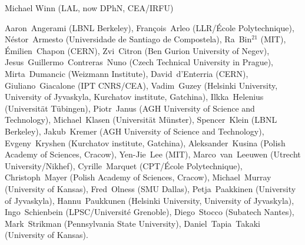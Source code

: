 { \small
{} Michael Winn (LAL, now DPhN, CEA/IRFU) %

 Aaron~Angerami (LBNL Berkeley), %
 Fran\c{c}ois~Arleo (LLR/{\'E}cole Polytechnique), %
 N{\'e}stor~Armesto (Universidade de Santiago de Compostela), %
 Ra~Bin$^{21}$ (MIT), %
 {\'E}milien~Chapon (CERN), %
 Zvi~Citron (Ben Gurion University of Negev), %
 Jesus~Guillermo~Contreras~Nuno (Czech Technical University in Prague),  %
 Mirta~Dumancic (Weizmann Institute),
 David~d'Enterria (CERN), %
 Giuliano~Giacalone (IPT CNRS/CEA), %
 Vadim~Guzey (Helsinki University, University of Jyvaskyla, Kurchatov institute, Gatchina),  %
 Ilkka~Helenius (Universit\"{a}t T\"{u}bingen), %
Piotr~Janus (AGH University of Science and Technology),
Michael~Klasen (Universit\"{a}t M\"{u}nster), %
Spencer~Klein (LBNL Berkeley), %
Jakub~Kremer (AGH University of Science and Technology),
 Evgeny~Kryshen (Kurchatov institute, Gatchina), %
 Aleksander~Kusina (Polish Academy of Sciences, Cracow), %
 Yen-Jie~Lee (MIT), %
 Marco~van~Leeuwen (Utrecht University/Nikhef), %
 Cyrille~Marquet (CPT/{\'E}cole Polytechnique), %
 Christoph~Mayer  (Polish Academy of Sciences, Cracow), %
 Michael~Murray (University of Kansas),%
 Fred~Olness (SMU Dallas), %
 Petja~Paakkinen (University of Jyvaskyla),%
 Hannu~Paukkunen (Helsinki University, University of Jyvaskyla), %
 Ingo~Schienbein (LPSC/Universit{\'e} Grenoble), %
 Diego~Stocco (Subatech Nantes), %
 Mark~Strikman (Pennsylvania State University), %
 Daniel~Tapia~Takaki (University of Kansas). %
}

